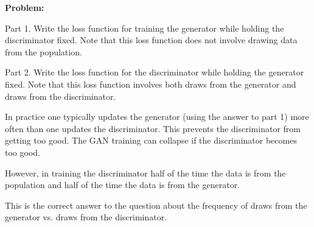 \documentclass{article}
\begin{document}
{\bf Problem:}
    
Part 1.  Write the loss function for training the generator while holding the discriminator fixed.  Note that this loss function does not involve drawing data from the population.

Part 2.  Write the loss function for the discriminator while holding the generator fixed.  Note that this loss function involves both draws from the generator and draws from the discriminator.

In practice one typically updates the generator (using the answer to part 1) more often than
one updates the discriminator.  This prevents the discriminator from getting too good.  The GAN training can collapse if the discriminator becomes too good.

However, in training the discriminator half of the time the data is from the population and half of the time the data is from the generator.

This is the correct answer to the question about the frequency of draws from the generator vs. draws from the discriminator.
\end{document}

